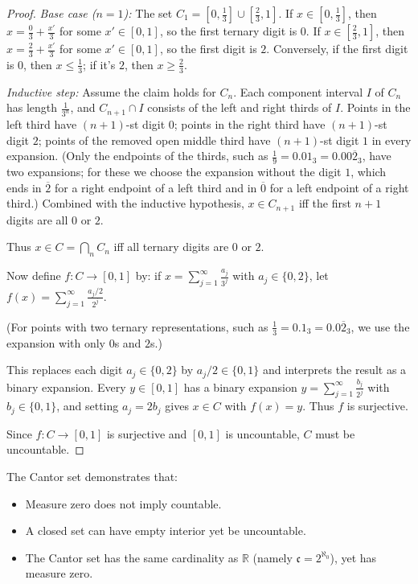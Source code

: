 \documentclass[11pt]{report}
\begin{document}
\begin{proof}
\textit{Base case ($n=1$):} The set $C_1 = [0, \frac{1}{3}] \cup [\frac{2}{3}, 1]$. If $x \in [0, \frac{1}{3}]$, then $x = \frac{0}{3} + \frac{x'}{3}$ for some $x' \in [0,1]$, so the first ternary digit is $0$. If $x \in [\frac{2}{3}, 1]$, then $x = \frac{2}{3} + \frac{x'}{3}$ for some $x' \in [0,1]$, so the first digit is $2$. Conversely, if the first digit is $0$, then $x \leq \frac{1}{3}$; if it's $2$, then $x \geq \frac{2}{3}$.

\textit{Inductive step:} Assume the claim holds for $C_n$. Each component interval $I$ of $C_n$ has length $\frac{1}{3^n}$, and $C_{n+1} \cap I$ consists of the left and right thirds of $I$. Points in the left third have $(n+1)$-st digit $0$; points in the right third have $(n+1)$-st digit $2$; points of the removed open middle third have $(n+1)$-st digit $1$ in every expansion. (Only the endpoints of the thirds, such as $\frac{1}{9} = 0.01_3 = 0.00\overline{2}_3$, have two expansions; for these we choose the expansion without the digit $1$, which ends in $\overline{2}$ for a right endpoint of a left third and in $\overline{0}$ for a left endpoint of a right third.) Combined with the inductive hypothesis, $x \in C_{n+1}$ iff the first $n+1$ digits are all $0$ or $2$.

Thus $x \in C = \bigcap_n C_n$ iff all ternary digits are $0$ or $2$.

Now define $f: C \to [0, 1]$ by: if $x = \sum_{j=1}^{\infty} \frac{a_j}{3^j}$ with $a_j \in \{0, 2\}$, let $f(x) = \sum_{j=1}^{\infty} \frac{a_j/2}{2^j}$.

(For points with two ternary representations, such as $\frac{1}{3} = 0.1_3 = 0.0\overline{2}_3$, we use the expansion with only $0$s and $2$s.)

This replaces each digit $a_j \in \{0, 2\}$ by $a_j/2 \in \{0, 1\}$ and interprets the result as a binary expansion. Every $y \in [0, 1]$ has a binary expansion $y = \sum_{j=1}^{\infty} \frac{b_j}{2^j}$ with $b_j \in \{0, 1\}$, and setting $a_j = 2b_j$ gives $x \in C$ with $f(x) = y$. Thus $f$ is surjective.

Since $f: C \to [0, 1]$ is surjective and $[0, 1]$ is uncountable, $C$ must be uncountable.
\end{proof}

\begin{rembox}
The Cantor set demonstrates that:
\begin{itemize}
    \item Measure zero does not imply countable.
    \item A closed set can have empty interior yet be uncountable.
    \item The Cantor set has the same cardinality as $\mathbb{R}$ (namely $\mathfrak{c} = 2^{\aleph_0}$), yet has measure zero.
\end{itemize}
\end{rembox}
\end{document}

